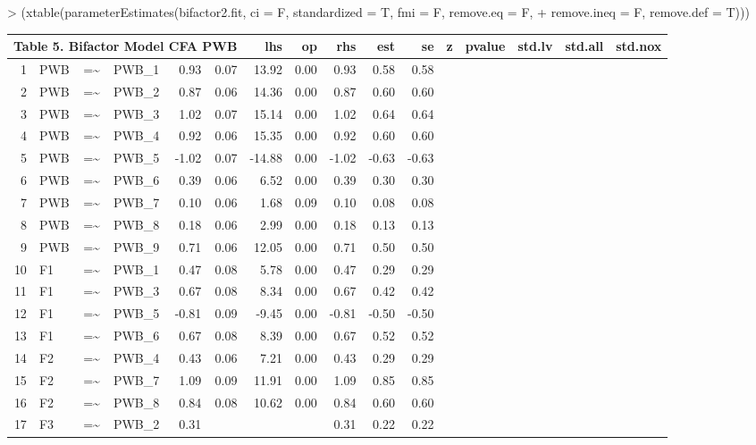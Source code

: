 \documentclass{article}
\begin{document}
> (xtable(parameterEstimates(bifactor2.fit, ci = F, standardized = T,  fmi = F, remove.eq = F, 
+                    remove.ineq = F, remove.def = T)))
\begin{table}[ht]
\centering
\begin{tabular}{rlllrrrrrrr}
 \multicolumn{ 6 }{l}{ Table 5. Bifactor Model CFA PWB} \cr 
  \hline
 & lhs & op & rhs & est & se & z & pvalue & std.lv & std.all & std.nox \\ 
  \hline
1 & PWB & =\~{} & PWB\_1 & 0.93 & 0.07 & 13.92 & 0.00 & 0.93 & 0.58 & 0.58 \\ 
  2 & PWB & =\~{} & PWB\_2 & 0.87 & 0.06 & 14.36 & 0.00 & 0.87 & 0.60 & 0.60 \\ 
  3 & PWB & =\~{} & PWB\_3 & 1.02 & 0.07 & 15.14 & 0.00 & 1.02 & 0.64 & 0.64 \\ 
  4 & PWB & =\~{} & PWB\_4 & 0.92 & 0.06 & 15.35 & 0.00 & 0.92 & 0.60 & 0.60 \\ 
  5 & PWB & =\~{} & PWB\_5 & -1.02 & 0.07 & -14.88 & 0.00 & -1.02 & -0.63 & -0.63 \\ 
  6 & PWB & =\~{} & PWB\_6 & 0.39 & 0.06 & 6.52 & 0.00 & 0.39 & 0.30 & 0.30 \\ 
  7 & PWB & =\~{} & PWB\_7 & 0.10 & 0.06 & 1.68 & 0.09 & 0.10 & 0.08 & 0.08 \\ 
  8 & PWB & =\~{} & PWB\_8 & 0.18 & 0.06 & 2.99 & 0.00 & 0.18 & 0.13 & 0.13 \\ 
  9 & PWB & =\~{} & PWB\_9 & 0.71 & 0.06 & 12.05 & 0.00 & 0.71 & 0.50 & 0.50 \\ 
  10 & F1 & =\~{} & PWB\_1 & 0.47 & 0.08 & 5.78 & 0.00 & 0.47 & 0.29 & 0.29 \\ 
  11 & F1 & =\~{} & PWB\_3 & 0.67 & 0.08 & 8.34 & 0.00 & 0.67 & 0.42 & 0.42 \\ 
  12 & F1 & =\~{} & PWB\_5 & -0.81 & 0.09 & -9.45 & 0.00 & -0.81 & -0.50 & -0.50 \\ 
  13 & F1 & =\~{} & PWB\_6 & 0.67 & 0.08 & 8.39 & 0.00 & 0.67 & 0.52 & 0.52 \\ 
  14 & F2 & =\~{} & PWB\_4 & 0.43 & 0.06 & 7.21 & 0.00 & 0.43 & 0.29 & 0.29 \\ 
  15 & F2 & =\~{} & PWB\_7 & 1.09 & 0.09 & 11.91 & 0.00 & 1.09 & 0.85 & 0.85 \\ 
  16 & F2 & =\~{} & PWB\_8 & 0.84 & 0.08 & 10.62 & 0.00 & 0.84 & 0.60 & 0.60 \\ 
  17 & F3 & =\~{} & PWB\_2 & 0.31 &  &  &  & 0.31 & 0.22 & 0.22 \\ 

\end{tabular}
\end{table}
\end{document}
